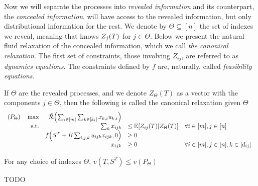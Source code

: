 \documentclass[letterpaper,11pt]{article}
\begin{document}
Now we will separate the processes into \emph{revealed information} and its counterpart, the \emph{concealed information}.
\off will have access to the revealed information, but only distributional information for the rest.
We denote by $\Theta\subseteq [n]$ the set of indexes we reveal, meaning that \off knows $Z_j(T)$ for $j\in\Theta$.
Below we present the natural fluid relaxation of the concealed information, which we call \emph{the canonical relaxation}.
The first set of constraints, those involving $Z_{ij}$, are referred to as \emph{dynamics equations}.
The constraints defined by $f$ are, naturally, called \emph{feasibility equations}.

\begin{definition}
If $\Theta$ are the revealed processes, and we denote $Z_\Theta(T)$ as a vector with the components $j\in\Theta$, then the following is called the canonical relaxation given $\Theta$
\begin{equation}\label{eq:theta_relaxation}
\begin{array}{rrll}
(P_\Theta)\quad \max  & \tilde \Re\prn*{\sum_{i\in [m]}\sum_{k\in [k_i]}x_{k,i}u_{k,i}} \\
\text{s.t.}&  \sum_k x_{ijk} & \leq \E[Z_{ij}(T)| Z_\Theta(T) ]  &\forall i\in[m], j\in[n] \\
& f\prn*{S^\T+B\sum_{i,j,k}u_{ijk}x_{ijk},0}&\geq 0  \\
& x_{ijk}&\geq 0 & \forall i\in [m], j\in [n], k\in [d_{ij}] .
\end{array}
\end{equation}
\end{definition}

\begin{proposition}
For any choice of indexes $\Theta$, $v(T,S^T)\leq v(P_\Theta)$	
\end{proposition}

\begin{definition}
	TODO
\end{definition}



\end{document}
